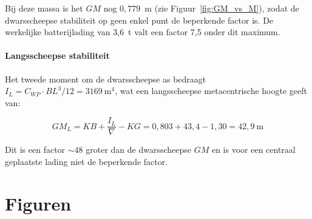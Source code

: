 Bij deze massa is het $GM$ nog $0{,}779$~m (zie Figuur~\ref{fig:GM_vs_M}),
zodat de dwarsscheepse stabiliteit op geen enkel punt de beperkende factor is.
De werkelijke batterijlading van 3{,}6~t valt een factor 7{,}5 onder dit maximum.

\paragraph{Langsscheepse stabiliteit}
Het tweede moment om de dwarsscheepse as bedraagt
$I_L = C_{WP} \cdot BL^3/12 = 3169\ \mathrm{m^4}$, wat een langsscheepse
metacentrische hoogte geeft van:

\begin{equation}
    GM_L = KB + \frac{I_L}{\nabla} - KG
         = 0{,}803 + 43{,}4 - 1{,}30
         = 42{,}9\ \mathrm{m}
\end{equation}

Dit is een factor $\sim 48$ groter dan de dwarsscheepse $GM$ en is voor een
centraal geplaatste lading niet de beperkende factor.

\section{Figuren}
\label{sec:stab_figuren}


